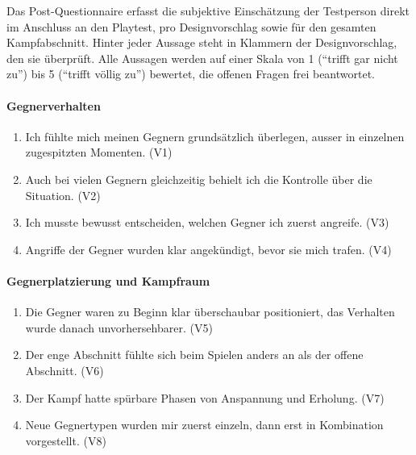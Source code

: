 \documentclass[../Main.tex]{subfiles}
\begin{document}
Das Post-Questionnaire erfasst die subjektive Einschätzung der Testperson direkt im Anschluss an den Playtest, pro Designvorschlag sowie für den gesamten Kampfabschnitt. Hinter jeder Aussage steht in Klammern der Designvorschlag, den sie überprüft. Alle Aussagen werden auf einer Skala von 1 (\enquote{trifft gar nicht zu}) bis 5 (\enquote{trifft völlig zu}) bewertet, die offenen Fragen frei beantwortet.
 
\paragraph{Gegnerverhalten}
\begin{enumerate}[label=\textbf{Q\arabic*}, leftmargin=1.5cm, itemsep=0.5em]
    \item Ich fühlte mich meinen Gegnern grundsätzlich überlegen, ausser in einzelnen zugespitzten Momenten. \hfill (V1)
    \item Auch bei vielen Gegnern gleichzeitig behielt ich die Kontrolle über die Situation. \hfill (V2)
    \item Ich musste bewusst entscheiden, welchen Gegner ich zuerst angreife. \hfill (V3)
    \item Angriffe der Gegner wurden klar angekündigt, bevor sie mich trafen. \hfill (V4)
\end{enumerate}
 
\paragraph{Gegnerplatzierung und Kampfraum}
\begin{enumerate}[label=\textbf{Q\arabic*}, leftmargin=1.5cm, itemsep=0.5em, resume]
    \item Die Gegner waren zu Beginn klar überschaubar positioniert, das Verhalten wurde danach unvorhersehbarer. \hfill (V5)
    \item Der enge Abschnitt fühlte sich beim Spielen anders an als der offene Abschnitt. \hfill (V6)
    \item Der Kampf hatte spürbare Phasen von Anspannung und Erholung. \hfill (V7)
    \item Neue Gegnertypen wurden mir zuerst einzeln, dann erst in Kombination vorgestellt. \hfill (V8)
\end{enumerate}
 
\end{document}
